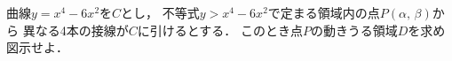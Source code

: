 \documentclass[../../main.tex]{subfiles}
\begin{document}
曲線$y=x^4-6x^2$を$C$とし，
不等式$y>x^4-6x^2$で定まる領域内の点$P(\alpha, \, \beta)$から
異なる4本の接線が$C$に引けるとする．
このとき点$P$の動きうる領域$D$を求め図示せよ．
\end{document}

